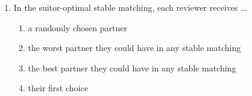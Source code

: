 \documentclass[11pt]{article}
\begin{document}
\begin{enumerate}[itemsep=6pt]
\begin{enumerate}
    \item more than one reviewer
    \item any reviewer at all
  \end{enumerate}
  \item In the suitor-optimal stable matching, each reviewer receives ...
  \begin{enumerate}
    \item a randomly chosen partner
    \item the worst partner they could have in any stable matching
    \item the best partner they could have in any stable matching
    \item their first choice
  \end{enumerate}
\end{enumerate}
\end{document}
